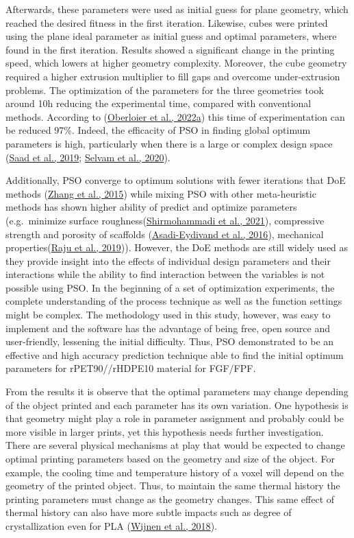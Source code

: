 \documentclass[
  12pt,
  number,
  review]{elsarticle}
\begin{document}
Afterwards, these parameters were used as initial guess for plane
geometry, which reached the desired fitness in the first iteration.
Likewise, cubes were printed using the plane ideal parameter as initial
guess and optimal parameters, where found in the first iteration.
Results showed a significant change in the printing speed, which lowers
at higher geometry complexity. Moreover, the cube geometry required a
higher extrusion multiplier to fill gaps and overcome under-extrusion
problems. The optimization of the parameters for the three geometries
took around 10h reducing the experimental time, compared with
conventional methods. According to
(\protect\hyperlink{ref-oberloier2022}{Oberloier et al., 2022a}) this
time of experimentation can be reduced 97\%. Indeed, the efficacity of
PSO in finding global optimum parameters is high, particularly when
there is a large or complex design space
(\protect\hyperlink{ref-saad2019a}{Saad et al., 2019};
\protect\hyperlink{ref-selvam2020}{Selvam et al., 2020}).

Additionally, PSO converge to optimum solutions with fewer iterations
that DoE methods (\protect\hyperlink{ref-zhang2015}{Zhang et al., 2015})
while mixing PSO with other meta-heuristic methods has shown higher
ability of predict and optimize parameters (e.g.~minimize surface
roughness(\protect\hyperlink{ref-shirmohammadi2021}{Shirmohammadi et
al., 2021}), compressive strength and porosity of scaffolds
(\protect\hyperlink{ref-asadi-eydivand2016}{Asadi-Eydivand et al.,
2016}), mechanical properties(\protect\hyperlink{ref-raju2019}{Raju et
al., 2019})). However, the DoE methods are still widely used as they
provide insight into the effects of individual design parameters and
their interactions while the ability to find interaction between the
variables is not possible using PSO. In the beginning of a set of
optimization experiments, the complete understanding of the process
technique as well as the function settings might be complex. The
methodology used in this study, however, was easy to implement and the
software has the advantage of being free, open source and user-friendly,
lessening the initial difficulty. Thus, PSO demonstrated to be an
effective and high accuracy prediction technique able to find the
initial optimum parameters for rPET90//rHDPE10 material for FGF/FPF.

From the results it is observe that the optimal parameters may change
depending of the object printed and each parameter has its own
variation. One hypothesis is that geometry might play a role in
parameter assignment and probably could be more visible in larger
prints, yet this hypothesis needs further investigation. There are
several physical mechanisms at play that would be expected to change
optimal printing parameters based on the geometry and size of the
object. For example, the cooling time and temperature history of a voxel
will depend on the geometry of the printed object. Thus, to maintain the
same thermal history the printing parameters must change as the geometry
changes. This same effect of thermal history can also have more subtle
impacts such as degree of crystallization even for PLA
(\protect\hyperlink{ref-wijnen2018}{Wijnen et al., 2018}).
\end{document}
